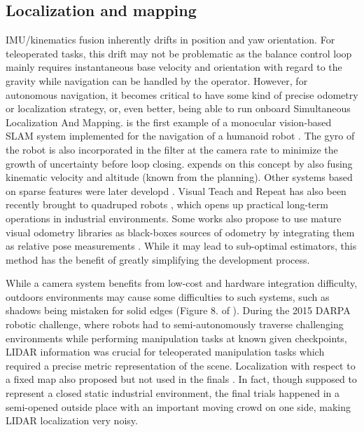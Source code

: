 \subsection{Localization and mapping}
IMU/kinematics fusion inherently drifts in position and yaw orientation. For teleoperated tasks, this drift may not be problematic as the balance control loop
mainly requires instantaneous base velocity and orientation with regard to the gravity while navigation can be handled by the operator. However, for autonomous
navigation, it becomes critical to have some kind of precise odometry or localization strategy, or, even better, being able to run onboard Simultaneous Localization And Mapping. 
\cite{davison2007monoslam} is the first example of a monocular vision-based SLAM system implemented for the navigation of a humanoid robot . The gyro of the robot
is also incorporated in the filter at the camera rate to minimize the growth of uncertainty before loop closing. \cite{stasse2006real} expends on this concept by also fusing
kinematic velocity and altitude (known from the planning). Other systems based on sparse features were later developd \cite{ahn2012board, oriolo2012vision, oriolo2016humanoid, kwak20093d}. 
Visual Teach and Repeat \cite{furgale2010visual} has also been recently brought to quadruped 
robots \cite{mattamala2021learning, mattamala2022efficient}, which opens up practical long-term operations in industrial environments. Some works also propose to use mature visual odometry libraries
as black-boxes sources of odometry by integrating them as relative pose measurements \cite{hartley2018legged,hartley2018hybrid}. While it may lead to sub-optimal estimators, 
this method has the benefit of greatly simplifying the development process.

While a camera system benefits from low-cost and hardware integration difficulty, outdoors environments 
may cause some difficulties to such systems, such as shadows being mistaken for solid edges (Figure 8. of \cite{fallon2014drift}).
During the 2015 DARPA robotic challenge, where robots had to semi-autonomously traverse challenging environments while performing manipulation tasks at known given checkpoints,  
LIDAR information was crucial for teleoperated manipulation tasks \cite{koolen2016design} which required a precise metric representation of the scene. 
Localization with respect to a fixed map also proposed \cite{fallon2014drift} but not used in the finals \cite{fallon2016perception}. In fact, though supposed 
to represent a closed static industrial environment, the final trials happened in a semi-opened outside place with an important moving crowd on one side, making
LIDAR localization very noisy. 

